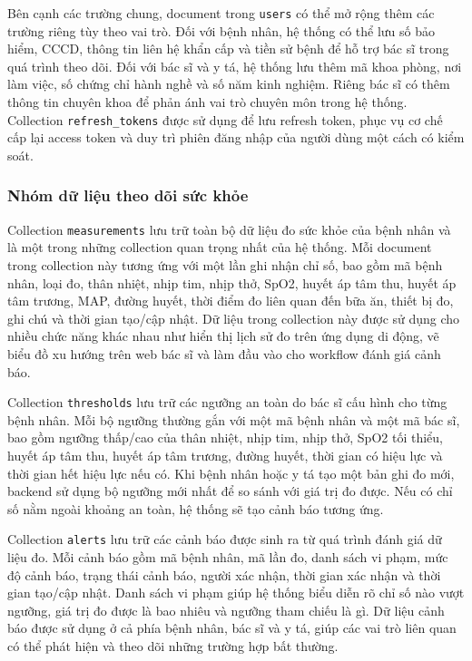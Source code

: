\par Bên cạnh các trường chung, document trong \texttt{users} có thể mở rộng thêm các trường riêng tùy theo vai trò. Đối với bệnh nhân, hệ thống có thể lưu số bảo hiểm, CCCD, thông tin liên hệ khẩn cấp và tiền sử bệnh để hỗ trợ bác sĩ trong quá trình theo dõi. Đối với bác sĩ và y tá, hệ thống lưu thêm mã khoa phòng, nơi làm việc, số chứng chỉ hành nghề và số năm kinh nghiệm. Riêng bác sĩ có thêm thông tin chuyên khoa để phản ánh vai trò chuyên môn trong hệ thống. Collection \texttt{refresh\_tokens} được sử dụng để lưu refresh token, phục vụ cơ chế cấp lại access token và duy trì phiên đăng nhập của người dùng một cách có kiểm soát.

\subsubsection{Nhóm dữ liệu theo dõi sức khỏe}

\par Collection \texttt{measurements} lưu trữ toàn bộ dữ liệu đo sức khỏe của bệnh nhân và là một trong những collection quan trọng nhất của hệ thống. Mỗi document trong collection này tương ứng với một lần ghi nhận chỉ số, bao gồm mã bệnh nhân, loại đo, thân nhiệt, nhịp tim, nhịp thở, SpO2, huyết áp tâm thu, huyết áp tâm trương, MAP, đường huyết, thời điểm đo liên quan đến bữa ăn, thiết bị đo, ghi chú và thời gian tạo/cập nhật. Dữ liệu trong collection này được sử dụng cho nhiều chức năng khác nhau như hiển thị lịch sử đo trên ứng dụng di động, vẽ biểu đồ xu hướng trên web bác sĩ và làm đầu vào cho workflow đánh giá cảnh báo.

\par Collection \texttt{thresholds} lưu trữ các ngưỡng an toàn do bác sĩ cấu hình cho từng bệnh nhân. Mỗi bộ ngưỡng thường gắn với một mã bệnh nhân và một mã bác sĩ, bao gồm ngưỡng thấp/cao của thân nhiệt, nhịp tim, nhịp thở, SpO2 tối thiểu, huyết áp tâm thu, huyết áp tâm trương, đường huyết, thời gian có hiệu lực và thời gian hết hiệu lực nếu có. Khi bệnh nhân hoặc y tá tạo một bản ghi đo mới, backend sử dụng bộ ngưỡng mới nhất để so sánh với giá trị đo được. Nếu có chỉ số nằm ngoài khoảng an toàn, hệ thống sẽ tạo cảnh báo tương ứng.

\par Collection \texttt{alerts} lưu trữ các cảnh báo được sinh ra từ quá trình đánh giá dữ liệu đo. Mỗi cảnh báo gồm mã bệnh nhân, mã lần đo, danh sách vi phạm, mức độ cảnh báo, trạng thái cảnh báo, người xác nhận, thời gian xác nhận và thời gian tạo/cập nhật. Danh sách vi phạm giúp hệ thống biểu diễn rõ chỉ số nào vượt ngưỡng, giá trị đo được là bao nhiêu và ngưỡng tham chiếu là gì. Dữ liệu cảnh báo được sử dụng ở cả phía bệnh nhân, bác sĩ và y tá, giúp các vai trò liên quan có thể phát hiện và theo dõi những trường hợp bất thường.

